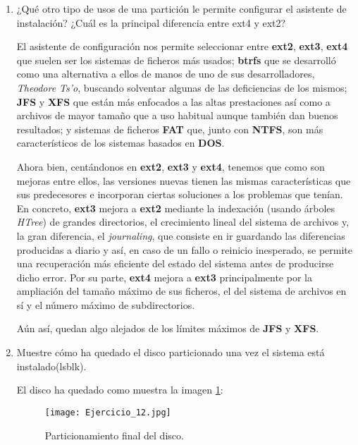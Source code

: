 \documentclass[paper=a4, fontsize=11pt]{scrartcl} %
\numberwithin{equation}{section} %
\numberwithin{figure}{section} %
\numberwithin{table}{section} %
\begin{document}
\begin{enumerate}
		\item ¿Qué otro tipo de usos de una partición le permite configurar el asistente de instalación?
		¿Cuál es la principal diferencia entre ext4 y ext2?
		
		El asistente de configuración nos permite seleccionar entre \textbf{ext2}\cite{ext2},
		\textbf{ext3}\cite{ext3}, \textbf{ext4}\cite{ext4} que suelen ser los sistemas de ficheros más
		usados; \textbf{btrfs}\cite{btrfs} que se desarrolló como una alternativa a ellos de manos de
		uno de sus desarrolladores, \textit{Theodore Ts'o}, buscando solventar algunas de las
		deficiencias de los mismos; \textbf{JFS}\cite{JFS} y \textbf{XFS}\cite{XFS} que están más
		enfocados a las altas prestaciones así como a archivos de mayor tamaño que a uso habitual
		aunque también dan buenos resultados; y sistemas de ficheros \textbf{FAT}\cite{FAT} que,
		junto con \textbf{NTFS}\cite{NTFS}, son más característicos de los sistemas basados en
		\textbf{DOS}.
		
		Ahora bien, centándonos en \textbf{ext2}, \textbf{ext3} y \textbf{ext4}, tenemos que como son
		mejoras entre ellos, las versiones nuevas tienen las mismas características que sus predecesores
		e incorporan ciertas soluciones a los problemas que tenían.
		\newline
		En concreto, \textbf{ext3} mejora a \textbf{ext2} mediante la indexación (usando árboles
		\textit{HTree}) de grandes directorios, el crecimiento lineal del sistema de archivos y, la
		gran diferencia, el \textit{journaling}\cite{journaling}, que consiste en ir guardando las
		diferencias producidas a diario y así, en caso de un fallo o reinicio inesperado, se permite
		una recuperación más eficiente del estado del sistema antes de producirse dicho error.
		\newline
		Por su parte, \textbf{ext4} mejora a \textbf{ext3} principalmente por la ampliación del tamaño
		máximo de sus ficheros, el del sistema de archivos en sí y el número máximo de subdirectorios.
		
		Aún así, quedan algo alejados de los límites máximos de \textbf{JFS} y \textbf{XFS}.
		
		\item Muestre cómo ha quedado el disco particionado una vez el sistema está instalado(lsblk).
		
		El disco ha quedado como muestra la imagen \ref{fig:disco}:
		
		\begin{figure}[ht!]
			\centering
			\texttt{[image: Ejercicio\_12.jpg]}
			\caption{Particionamiento final del disco.}
			\label{fig:disco}	
		\end{figure}
		

\end{enumerate}
\end{document}

